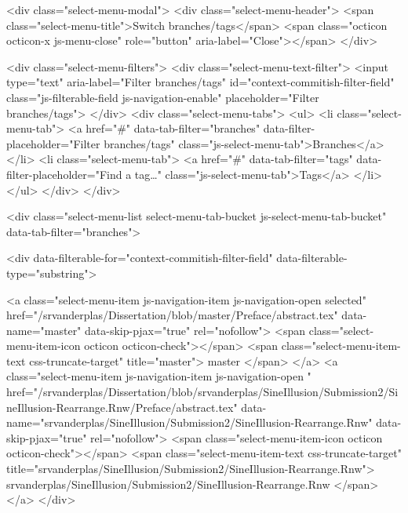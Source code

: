     <div class="select-menu-modal">
      <div class="select-menu-header">
        <span class="select-menu-title">Switch branches/tags</span>
        <span class="octicon octicon-x js-menu-close" role="button" aria-label="Close"></span>
      </div>

      <div class="select-menu-filters">
        <div class="select-menu-text-filter">
          <input type="text" aria-label="Filter branches/tags" id="context-commitish-filter-field" class="js-filterable-field js-navigation-enable" placeholder="Filter branches/tags">
        </div>
        <div class="select-menu-tabs">
          <ul>
            <li class="select-menu-tab">
              <a href="#" data-tab-filter="branches" data-filter-placeholder="Filter branches/tags" class="js-select-menu-tab">Branches</a>
            </li>
            <li class="select-menu-tab">
              <a href="#" data-tab-filter="tags" data-filter-placeholder="Find a tag…" class="js-select-menu-tab">Tags</a>
            </li>
          </ul>
        </div>
      </div>

      <div class="select-menu-list select-menu-tab-bucket js-select-menu-tab-bucket" data-tab-filter="branches">

        <div data-filterable-for="context-commitish-filter-field" data-filterable-type="substring">


            <a class="select-menu-item js-navigation-item js-navigation-open selected"
               href="/srvanderplas/Dissertation/blob/master/Preface/abstract.tex"
               data-name="master"
               data-skip-pjax="true"
               rel="nofollow">
              <span class="select-menu-item-icon octicon octicon-check"></span>
              <span class="select-menu-item-text css-truncate-target" title="master">
                master
              </span>
            </a>
            <a class="select-menu-item js-navigation-item js-navigation-open "
               href="/srvanderplas/Dissertation/blob/srvanderplas/SineIllusion/Submission2/SineIllusion-Rearrange.Rnw/Preface/abstract.tex"
               data-name="srvanderplas/SineIllusion/Submission2/SineIllusion-Rearrange.Rnw"
               data-skip-pjax="true"
               rel="nofollow">
              <span class="select-menu-item-icon octicon octicon-check"></span>
              <span class="select-menu-item-text css-truncate-target" title="srvanderplas/SineIllusion/Submission2/SineIllusion-Rearrange.Rnw">
                srvanderplas/SineIllusion/Submission2/SineIllusion-Rearrange.Rnw
              </span>
            </a>
        </div>

